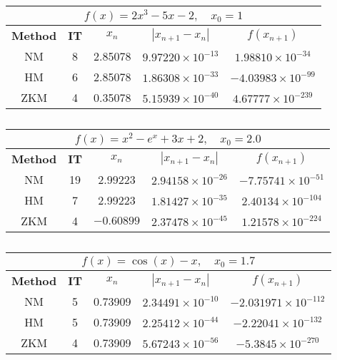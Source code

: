 \begin{table}[H]
		\caption{}
		\renewcommand{\arraystretch}{1.5}
		\centering
		\begin{english}
	\begin{tabular}{|c|c|c|c|c|}
		\hline
		\multicolumn{5}{|c|}{$f(x) = 2x^3 - 5x - 2, \quad x_0 = 1$}\\
		\hline
		\textbf{Method} & \textbf{IT} & $x_n$ & $|x_{n+1}-x_n|$& $f(x_{n+1})$ \\
		\hline
		NM & 8 & 2.85078 & $9.97220\times 10^{-13}$ & $1.98810\times 10^{-34}$\\
		HM & 6 & 2.85078 & $1.86308\times 10^{-33}$ & $-4.03983\times 10^{-99}$\\
		ZKM & 4 & 0.35078 & $5.15939\times10^{-40}$ & $4.67777 \times10^{-239}$\\
		\hline
	\end{tabular}
\end{english}
\end{table}
\vspace{1cm}
\begin{table}[H]
	\caption{}
	\renewcommand{\arraystretch}{1.5}
	\centering
	\begin{english}
		\begin{tabular}{|c|c|c|c|c|}
			\hline
			\multicolumn{5}{|c|}{$f(x) = x^2 - e^x + 3x +2, \quad x_0 = 2.0$}\\
			\hline
			\textbf{Method} & \textbf{IT} & $x_n$ & $|x_{n+1}-x_n|$& $f(x_{n+1})$ \\
			\hline
			NM & 19 & 2.99223 & $2.94158\times 10^{-26}$ & $-7.75741\times 10^{-51}$\\
			HM & 7 & 2.99223 & $1.81427\times 10^{-35}$ & $2.40134\times 10^{-104}$\\
			ZKM & 4 & $-0.60899$ & $2.37478\times10^{-45}$ & $1.21578\times10^{-224}$\\
			\hline
		\end{tabular}
	\end{english}
\end{table}
\newpage
\begin{table}[H]
	\caption{}
	\renewcommand{\arraystretch}{1.5}
	\centering
	\begin{english}
		\begin{tabular}{|c|c|c|c|c|}
			\hline
			\multicolumn{5}{|c|}{$f(x) = \cos(x) - x, \quad x_0 = 1.7$}\\
			\hline
			\textbf{Method} & \textbf{IT} & $x_n$ & $|x_{n+1}-x_n|$& $f(x_{n+1})$ \\
			\hline
			NM & 5 & 0.73909 & $2.34491\times 10^{-10}$ & $-2.031971\times 10^{-112}$\\
			HM & 5 & 0.73909 & $2.25412\times 10^{-44}$ & $-2.22041\times 10^{-132}$\\
			ZKM & 4 & 0.73909 & $5.67243\times10^{-56}$ & $-5.3845 \times10^{-270}$\\
			\hline
		\end{tabular}
	\end{english}
\end{table}
